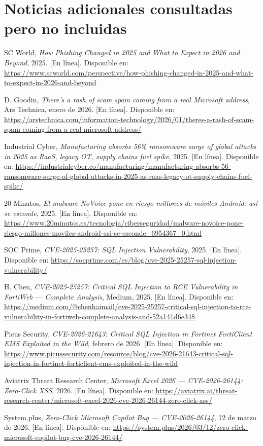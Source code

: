 \section*{Noticias adicionales consultadas pero no incluidas}
\begin{enumerate}[label={[}\arabic*{]}, start=19]
    \item SC World, \textit{How Phishing Changed in 2025 and What to Expect in 2026 and Beyond}, 2025. [En línea]. Disponible en: \url{https://www.scworld.com/perspective/how-phishing-changed-in-2025-and-what-to-expect-in-2026-and-beyond}
    \item D. Goodin, \textit{There's a rash of scam spam coming from a real Microsoft address}, Ars Technica, enero de 2026. [En línea]. Disponible en: \url{https://arstechnica.com/information-technology/2026/01/theres-a-rash-of-scam-spam-coming-from-a-real-microsoft-address/}
    \item Industrial Cyber, \textit{Manufacturing absorbs 56\% ransomware surge of global attacks in 2025 as RaaS, legacy OT, supply chains fuel spike}, 2025. [En línea]. Disponible en: \url{https://industrialcyber.co/manufacturing/manufacturing-absorbs-56-ransomware-surge-of-global-attacks-in-2025-as-raas-legacy-ot-supply-chains-fuel-spike/}
    \item 20 Minutos, \textit{El malware NoVoice pone en riesgo millones de móviles Android: así se esconde}, 2025. [En línea]. Disponible en: \url{https://www.20minutos.es/tecnologia/ciberseguridad/malware-novoice-pone-riesgo-millones-moviles-android-asi-se-esconde_6954367_0.html}
    \item SOC Prime, \textit{CVE-2025-25257: SQL Injection Vulnerability}, 2025. [En línea]. Disponible en: \url{https://socprime.com/es/blog/cve-2025-25257-sql-injection-vulnerability/}
    \item H. Chen, \textit{CVE-2025-25257: Critical SQL Injection to RCE Vulnerability in FortiWeb — Complete Analysis}, Medium, 2025. [En línea]. Disponible en: \url{https://medium.com/@chenhaimail/cve-2025-25257-critical-sql-injection-to-rce-vulnerability-in-fortiweb-complete-analysis-and-52a141d6e348}
    \item Picus Security, \textit{CVE-2026-21643: Critical SQL Injection in Fortinet FortiClient EMS Exploited in the Wild}, febrero de 2026. [En línea]. Disponible en: \url{https://www.picussecurity.com/resource/blog/cve-2026-21643-critical-sql-injection-in-fortinet-forticlient-ems-exploited-in-the-wild}
    \item Aviatrix Threat Research Center, \textit{Microsoft Excel 2026 — CVE-2026-26144: Zero-Click XSS}, 2026. [En línea]. Disponible en: \url{https://aviatrix.ai/threat-research-center/microsoft-excel-2026-cve-2026-26144-zero-click-xss/}
    \item System.plus, \textit{Zero-Click Microsoft Copilot Bug — CVE-2026-26144}, 12 de marzo de 2026. [En línea]. Disponible en: \url{https://system.plus/2026/03/12/zero-click-microsoft-copilot-bug-cve-2026-26144/}
\end{enumerate}
